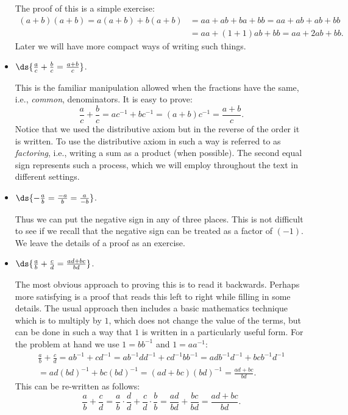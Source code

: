 \begin{itemize}
The proof of this is a simple exercise:
\begin{align*}
(a+b)(a+b)=a(a+b)+b(a+b)&=aa+ab+ba+bb=aa+ab+ab+bb\\
&=aa+(1+1)ab+bb=aa+2ab+bb.\end{align*}
Later  
we will have more compact ways of writing such things.\footnotemark
{}

\item $\ds{\frac{a}c+\frac{b}c=\frac{a+b}c}$.

This is the familiar manipulation allowed when the
fractions have the same, i.e., 
{\it common}, denominators.
It is easy to prove:
$$\frac{a}c+\frac{b}c=ac^{-1}+bc^{-1}=(a+b)c^{-1}=\frac{a+b}c.$$
Notice that we used the distributive axiom but in the reverse
of the order it is written.  To use the distributive axiom in
such a way is referred to as {\it factoring}, i.e., writing a
sum as a product (when possible).  The second equal sign represents such 
a process, which we will employ throughout the text in 
different settings.

\item $\ds{-\frac{a}b=\frac{-a}b=\frac{a}{-b}}$.

Thus we can put the negative sign in any of three
places. This is not difficult to see if we
recall that the negative sign can be treated
as a factor of $(-1)$.
 We leave the details of a proof as an exercise.  


\item $\ds{\frac{a}b+\frac{c}d=\frac{ad+bc}{bd}}$.

The most obvious  approach to proving this is
to read it backwards.  Perhaps more satisfying
is a proof that reads this left to right while
filling in some details.  The usual approach then
includes a basic mathematics technique which is 
to multiply by $1$, which does not change the
value of the terms, but can be done in 
such a way that  $1$ is written in a particularly
useful form.  For the problem at hand
we use $1=bb^{-1}$ and $1=aa^{-1}$:
\begin{multline*}
\frac{a}b+\frac{c}d=ab^{-1}+cd^{-1}=ab^{-1}dd^{-1}
+cd^{-1}bb^{-1}=adb^{-1}d^{-1}+bcb^{-1}d^{-1}\\
=ad(bd)^{-1}+bc(bd)^{-1}=(ad+bc)(bd)^{-1}
=\frac{ad+bc}{bd}.
\end{multline*}
This can be re-written as follows:\footnotemark
{}
$$
\frac{a}b+\frac{c}d
=\frac{a}b\cdot\frac{d}d+\frac{c}d\cdot\frac{b}b
=\frac{ad}{bd}+\frac{bc}{bd}=
\frac{ad+bc}{bd}.$$
\end{itemize}

